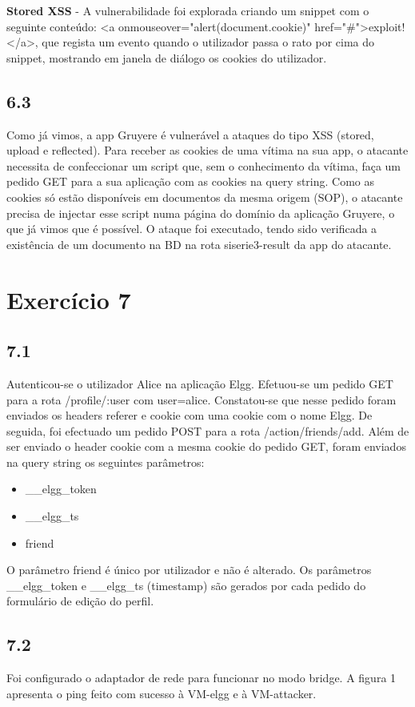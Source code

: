 \documentclass[11pt]{report}
\begin{document}
	 \textbf{Stored XSS} - A vulnerabilidade foi explorada criando um snippet com o seguinte conteúdo: <a onmouseover="alert(document.cookie)" href="\#">exploit!</a>, que regista um evento quando o utilizador passa o rato por cima do snippet, mostrando em janela de diálogo os cookies do utilizador.
	
	\subsection*{6.3}
	Como já vimos, a app Gruyere é vulnerável a ataques do tipo XSS (stored, upload e reflected). Para receber as cookies de uma vítima na sua app, o atacante necessita de confeccionar um script que, sem o conhecimento da vítima, faça um pedido GET para a sua aplicação com as cookies na query string.
	Como as cookies só estão disponíveis em documentos da mesma origem (SOP), o atacante precisa de injectar esse script numa página do domínio da aplicação Gruyere, o que já vimos que é possível.\newline
	O ataque foi executado, tendo sido verificada a existência de um documento na BD na rota siserie3-result da app do atacante.
	

	
\section{Exercício 7}
	\subsection*{7.1}
Autenticou-se o utilizador Alice na aplicação Elgg. Efetuou-se um pedido GET para a rota /profile/:user com user=alice. Constatou-se que nesse pedido foram enviados os headers referer e cookie com uma cookie com o nome Elgg.
De seguida, foi efectuado um pedido POST para a rota /action/friends/add. Além de ser enviado o header cookie com a mesma cookie do pedido GET, foram enviados na query string os seguintes parâmetros:
\begin{itemize}
	\item \_\_elgg\_token
	\item \_\_elgg\_ts
	\item friend	
\end{itemize}
O parâmetro friend é único por utilizador e não é alterado. Os parâmetros \_\_elgg\_token e \_\_elgg\_ts (timestamp) são gerados por cada pedido do formulário de edição do perfil.

	\subsection*{7.2}
	Foi configurado o adaptador de rede para funcionar no modo bridge. A figura 1 apresenta o ping feito com sucesso à VM-elgg e à VM-attacker.
	
\end{document}
